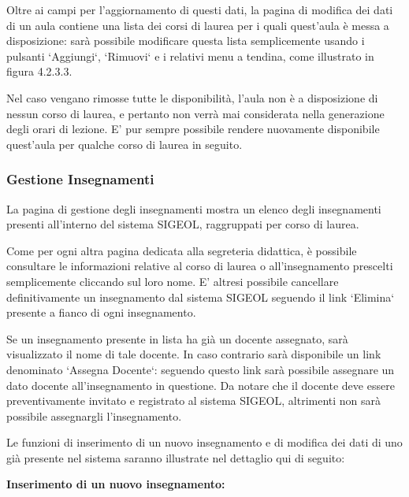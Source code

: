 \documentclass[11pt,a4paper]{article}
\begin{document}
Oltre ai campi per l'aggiornamento di questi dati, la pagina di modifica dei dati di un aula contiene una lista dei corsi di laurea per i quali quest'aula è messa a disposizione: sarà possibile modificare questa lista semplicemente usando i pulsanti `Aggiungi`, `Rimuovi` e i relativi menu a tendina, come illustrato in figura 4.2.3.3.

Nel caso vengano rimosse tutte le disponibilità, l'aula non è a disposizione di nessun corso di laurea, e pertanto non verrà mai considerata nella generazione degli orari di lezione.
E' pur sempre possibile rendere nuovamente disponibile quest'aula per qualche corso di laurea in seguito.
\subsubsection{Gestione Insegnamenti}
La pagina di gestione degli insegnamenti mostra un elenco degli insegnamenti presenti all'interno del sistema SIGEOL, raggruppati per corso di laurea.

Come per ogni altra pagina dedicata alla segreteria didattica, è possibile consultare le informazioni relative al corso di laurea o all'insegnamento prescelti semplicemente cliccando sul loro nome.
E' altresi possibile cancellare definitivamente un insegnamento dal sistema SIGEOL seguendo il link `Elimina` presente a fianco di ogni insegnamento.

Se un insegnamento presente in lista ha già un docente assegnato, sarà visualizzato il nome di tale docente.
In caso contrario sarà disponibile un link denominato `Assegna Docente`: seguendo questo link sarà possibile assegnare un dato docente all'insegnamento in questione. Da notare che il docente deve essere preventivamente invitato e registrato al sistema SIGEOL, altrimenti non sarà possibile assegnargli l'insegnamento.

Le funzioni di inserimento di un nuovo insegnamento e di modifica dei dati di uno già presente nel sistema saranno illustrate nel dettaglio qui di seguito:
\newline \newline
\begin{large}\textbf{Inserimento di un nuovo insegnamento:}\end{large}
\end{document}
